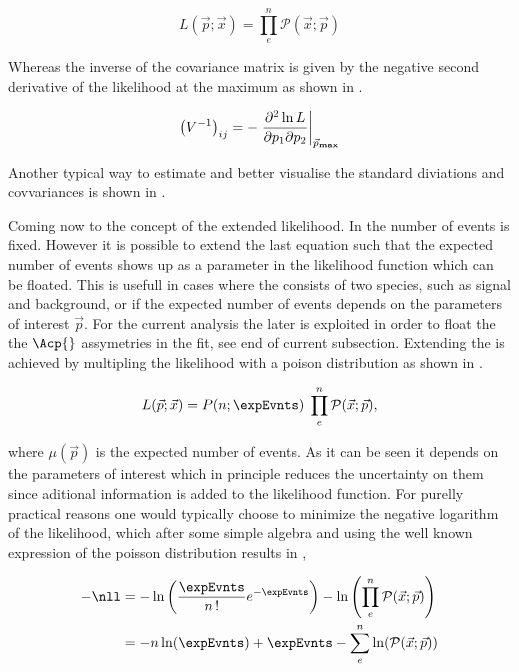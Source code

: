 \begin{equation}
L(\vec{p};\vec{x}) = \prod_e^n \mathcal{P}(\vec{x};\vec{p})
\label{likelihood}
\end{equation}

\noindent Whereas the inverse of the covariance matrix is given by the negative second derivative of the likelihood at the maximum as shown in .

\begin{equation}
\left( V^{-1} \right)_{ij} = - \left. \frac{\partial^2\ln L}{\partial p_1 \partial p_2} \right|_{ \vec{p}_{\rm\bf max}}
\label{covariance}
\end{equation}

\noindent Another typical way to estimate and better visualise the standard diviations and covvariances is shown in . 

Coming now to the concept of the extended likelihood. In  the number of events is fixed. However it is possible to 
extend the last equation such that the expected number of events shows up as a parameter in the likelihood function which can be floated. 
This is usefull in cases where the \pdf consists of two species, such as signal and background, or if the expected number of events depends on the 
parameters of interest $\vec{p}$. For the current analysis the later is exploited in order to float the the $\Acp{}$ assymetries in the fit,
see end of current subsection. Extending the \pdf is achieved by multipling the likelihood with a poison distribution as shown in .

\begin{equation}
L(\vec{p};\vec{x}) = P(n;\expEvnts) \; \prod_e^n \mathcal{P}(\vec{x};\vec{p}),
\label{extlikelihood}
\end{equation}

\noindent where $\mu(\vec{p})$ is the expected number of events. As it can be seen it depends on the parameters of interest which in 
principle reduces the uncertainty on them since aditional information is added to the likelihood function.
For purelly practical reasons one would typically choose to minimize the negative logarithm of the likelihood, which after some simple
algebra and using the well known expression of the poisson distribution results in ,

\begin{align}
  -\nll &= -\ln\left( \frac{\expEvnts}{n\,!} e^{-\expEvnts } \right) - \ln\left( \prod_e^n \mathcal{P}(\vec{x};\vec{p}) \right)  \nonumber \\
        &= - n\ln(\expEvnts) + \expEvnts - \sum_e^n \ln( \mathcal{P}(\vec{x};\vec{p}) )
\label{extloglikelihood}
\end{align}

